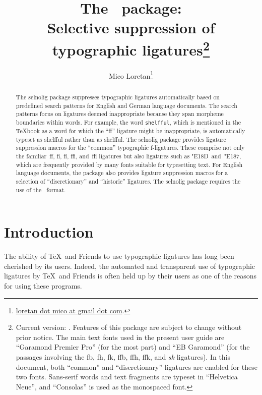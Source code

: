 \documentclass[12pt]{article}
\title{The \selnoligpackagename\ package: \\
Selective suppression of typographic ligatures\thanks{
Current version: \selnoligpackageversion. Features of this package are subject to change without prior notice. The main text fonts used in the present user guide are \enquote{Garamond Premier Pro} (for the most part) and \enquote{EB Garamond} (for the passages involving the \bgroup\ebg \mbox{fb}, \mbox{fh}, \mbox{fk}, \mbox{ffb}, \mbox{ffh},  \mbox{ffk}, and \emph{\mbox{sk}} ligatures\egroup). In this document, both \enquote{common} and \enquote{discretionary} ligatures are enabled for these two fonts. Sans-serif words and text fragments are typeset in \enquote{Helvetica Neue}, and \enquote{Consolas} is used as the monospaced font.}}
\author{Mico Loretan\thanks{
\href{mailto:loretan.mico@gmail.com}{loretan dot mico at gmail dot com}.}}
\date{\selnoligpackagedate}
\newcommand{\pkg}[1]{\textsf{#1}}
\newcommand{\opt}[1]{\texttt{#1}}
\begin{document}
\VerbatimFootnotes
{}

\maketitle


\begin{abstract}

The \pkg{selnolig} package suppresses typographic ligatures automatically based on pre\-defined search patterns for English and German language documents. The search patterns focus on ligatures deemed inappropriate because they span morpheme boundaries within words. For example, the word \opt{shelfful}, which is mentioned in the \TeX book as a word for which the \enquote{ff} ligature might be inappropriate, is automatically typeset as shelfful rather than as shel\mbox{ff}ul.
\newline\hspace*{\parindent}
The \pkg{selnolig} package provides ligature suppression macros  for the \enquote{common} typographic f-ligatures. These comprise not only the familiar~ff, fi, fl, ffi, and~ffl ligatures but also ligatures such as \char"E18D\ and~\char"E187, which are frequently provided by many fonts suitable for typesetting text.
\newline\hspace*{\parindent}
For English language documents, the package also provides ligature suppression macros for a selection of  \enquote{discretionary} and \enquote{historic} ligatures.
\newline\hspace*{\parindent}
The \pkg{selnolig} package requires the use of the \LuaLaTeX\ format. 
\end{abstract}


\tableofcontents

\clearpage
{}
\section{Introduction}

The ability of \TeX\ and Friends to use typographic ligatures has long been cherished by its users. Indeed, the automated and transparent use of typographic ligatures by \TeX\ and Friends is often held up by their users as one of the reasons for using these programs.
\end{document}
